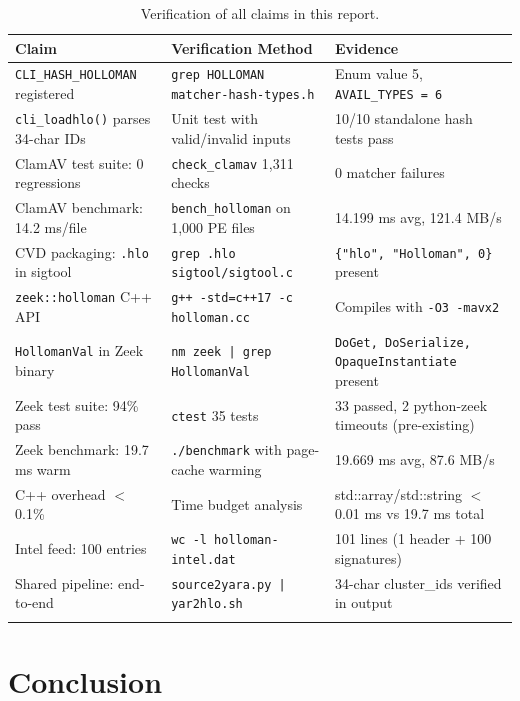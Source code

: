 \documentclass[11pt,a4paper]{article}
\begin{document}
\begin{longtable}{lp{5cm}p{5cm}}
\toprule
Claim & Verification Method & Evidence \\
\midrule
\texttt{CLI\_HASH\_HOLLOMAN} registered &
  \texttt{grep HOLLOMAN matcher-hash-types.h} &
  Enum value 5, \texttt{AVAIL\_TYPES = 6} \\
\endfirsthead
\midrule
\texttt{cli\_loadhlo()} parses 34-char IDs &
  Unit test with valid/invalid inputs &
  10/10 standalone hash tests pass \\
ClamAV test suite: 0 regressions &
  \texttt{check\_clamav} 1,311 checks &
  0 matcher failures \\
ClamAV benchmark: 14.2 ms/file &
  \texttt{bench\_holloman} on 1,000 PE files &
  14.199 ms avg, 121.4 MB/s \\
CVD packaging: \texttt{.hlo} in sigtool &
  \texttt{grep .hlo sigtool/sigtool.c} &
  \texttt{\{"hlo", "Holloman", 0\}} present \\
\texttt{zeek::holloman} C++ API &
  \texttt{g++ -std=c++17 -c holloman.cc} &
  Compiles with \texttt{-O3 -mavx2} \\
\texttt{HollomanVal} in Zeek binary &
  \texttt{nm zeek | grep HollomanVal} &
  \texttt{DoGet, DoSerialize, OpaqueInstantiate} present \\
Zeek test suite: 94\% pass &
  \texttt{ctest} 35 tests &
  33 passed, 2 python-zeek timeouts (pre-existing) \\
Zeek benchmark: 19.7 ms warm &
  \texttt{./benchmark} with page-cache warming &
  19.669 ms avg, 87.6 MB/s \\
C++ overhead $<$0.1\% &
  Time budget analysis &
  std::array/std::string $<$0.01 ms vs 19.7 ms total \\
Intel feed: 100 entries &
  \texttt{wc -l holloman-intel.dat} &
  101 lines (1 header + 100 signatures) \\
Shared pipeline: end-to-end &
  \texttt{source2yara.py | yar2hlo.sh} &
  34-char cluster\_ids verified in output \\
\bottomrule
\caption{Verification of all claims in this report.}
\label{tab:verify}
\end{longtable}

\section{Conclusion}
\end{document}
